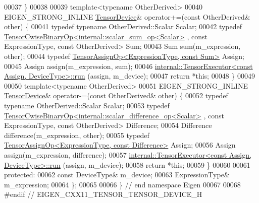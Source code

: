 \begin{DoxyCode}
00037     \}
00038 
00039     \textcolor{keyword}{template}<\textcolor{keyword}{typename} OtherDerived>
00040     EIGEN\_STRONG\_INLINE \hyperlink{class_eigen_1_1_tensor_device}{TensorDevice}& operator+=(\textcolor{keyword}{const} OtherDerived& other) \{
00041       \textcolor{keyword}{typedef} \textcolor{keyword}{typename} OtherDerived::Scalar Scalar;
00042       \textcolor{keyword}{typedef} \hyperlink{class_eigen_1_1_tensor_cwise_binary_op}{TensorCwiseBinaryOp<internal::scalar\_sum\_op<Scalar>}
      , \textcolor{keyword}{const} ExpressionType, \textcolor{keyword}{const} OtherDerived> Sum;
00043       Sum sum(m\_expression, other);
00044       \textcolor{keyword}{typedef} \hyperlink{class_eigen_1_1_tensor_assign_op}{TensorAssignOp<ExpressionType, const Sum>} Assign;
00045       Assign assign(m\_expression, sum);
00046       \hyperlink{class_eigen_1_1internal_1_1_tensor_executor}{internal::TensorExecutor<const Assign, DeviceType>::run}
      (assign, m\_device);
00047       \textcolor{keywordflow}{return} *\textcolor{keyword}{this};
00048     \}
00049 
00050     \textcolor{keyword}{template}<\textcolor{keyword}{typename} OtherDerived>
00051     EIGEN\_STRONG\_INLINE \hyperlink{class_eigen_1_1_tensor_device}{TensorDevice}& operator-=(\textcolor{keyword}{const} OtherDerived& other) \{
00052       \textcolor{keyword}{typedef} \textcolor{keyword}{typename} OtherDerived::Scalar Scalar;
00053       \textcolor{keyword}{typedef} \hyperlink{class_eigen_1_1_tensor_cwise_binary_op}{TensorCwiseBinaryOp<internal::scalar\_difference\_op<Scalar>}
      , \textcolor{keyword}{const} ExpressionType, \textcolor{keyword}{const} OtherDerived> Difference;
00054       Difference difference(m\_expression, other);
00055       \textcolor{keyword}{typedef} \hyperlink{class_eigen_1_1_tensor_assign_op}{TensorAssignOp<ExpressionType, const Difference>}
       Assign;
00056       Assign assign(m\_expression, difference);
00057       \hyperlink{class_eigen_1_1internal_1_1_tensor_executor}{internal::TensorExecutor<const Assign, DeviceType>::run}
      (assign, m\_device);
00058       \textcolor{keywordflow}{return} *\textcolor{keyword}{this};
00059     \}
00060 
00061   \textcolor{keyword}{protected}:
00062     \textcolor{keyword}{const} DeviceType& m\_device;
00063     ExpressionType& m\_expression;
00064 \};
00065 
00066 \} \textcolor{comment}{// end namespace Eigen}
00067 
00068 \textcolor{preprocessor}{#endif // EIGEN\_CXX11\_TENSOR\_TENSOR\_DEVICE\_H}
\end{DoxyCode}
